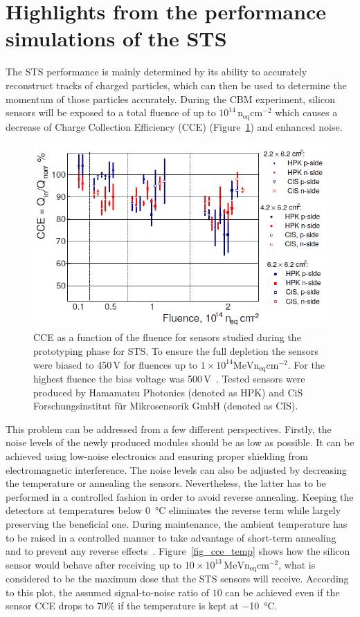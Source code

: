 \section{Highlights from the performance simulations of the STS}
The \gls{STS} performance is mainly determined by its ability to accurately reconstruct tracks of charged particles, which can then be used to determine the momentum of those particles accurately. During the \gls{CBM} experiment, silicon sensors will be exposed to a total fluence of up to $10^{14}\,\mathrm{n_{eq}cm^{-2}}$ which causes a decrease of Charge Collection Efficiency (CCE) (Figure~\ref{fig_cce}) and enhanced noise. 

\begin{figure}[!h]
\centering
\includegraphics[width=0.8\columnwidth]{Chapter2/images/CCE.png}
\caption{CCE as a function of the fluence for sensors studied during the prototyping phase for \gls{STS}. To ensure the full depletion the sensors were biased to 450\,V for fluences up to $1\times10^{14}\mathrm{MeV n_{eq}cm^{-2}}$. For the highest fluence the bias voltage was 500\,V~\cite{Momot:2019lnx}. Tested sensors were produced by Hamamatsu Photonics (denoted as HPK) and CiS Forschungsinstitut für Mikrosensorik GmbH (denoted as CIS).} 
\label{fig_cce}
\end{figure}

This problem can be addressed from a few different perspectives. Firstly, the noise levels of the newly produced modules should be as low as possible. It can be achieved using low-noise electronics and ensuring proper shielding from electromagnetic interference. The noise levels can also be adjusted by decreasing the temperature or annealing the sensors. Nevertheless, the latter has to be performed in a controlled fashion in order to avoid reverse annealing. Keeping the detectors at temperatures below \SI{0}{\celsius} eliminates the reverse term while largely preserving the beneficial one. During maintenance, the ambient temperature has to be raised in a controlled manner to take advantage of short-term annealing and to prevent any reverse effects~\cite{Hartmann:2017gzy}. Figure~\ref{fig_cce_temp} shows how the silicon sensor would behave after receiving up to $10\times10^{13}\,\mathrm{MeV n_{eq}cm^{-2}}$, what is considered to be the maximum dose that the \gls{STS} sensors will receive. According to this plot, the assumed signal-to-noise ratio of $10$ can be achieved even if the sensor \gls{CCE} drops to $70$\% if the temperature is kept at \SI{-10}{\celsius}.

